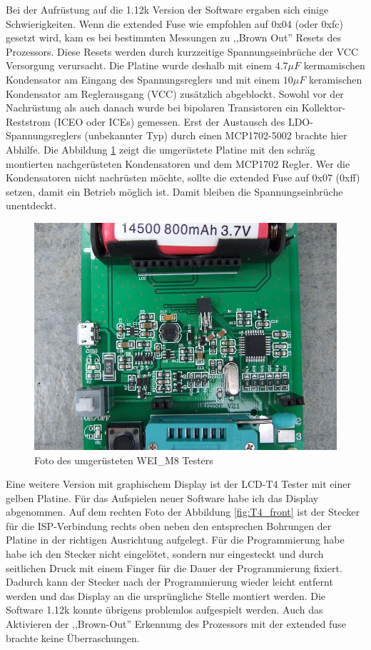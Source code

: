 Bei der Aufrüstung auf die 1.12k Version
der Software ergaben sich einige Schwierigkeiten. Wenn die extended Fuse wie empfohlen auf
0x04 (oder 0xfc) gesetzt wird, kam es bei bestimmten Messungen zu ,,Brown Out'' Resets des
Prozessors. Diese Resets werden durch kurzzeitige Spannungseinbrüche der VCC Versorgung
verursacht. Die Platine wurde deshalb mit einem \(4.7\mu F\) kermamischen Kondensator
am Eingang des Spannungsreglers und mit einem \(10\mu F\) keramischen Kondensator am
Reglerausgang (VCC) zusätzlich abgeblockt. Sowohl vor der Nachrüstung als auch danach
wurde bei bipolaren Transistoren ein Kollektor-Reststrom (ICEO oder ICEs) gemessen.
Erst der Austausch des LDO-Spannungsreglers (unbekannter Typ) durch einen MCP1702-5002
brachte hier Abhilfe. Die Abbildung \ref{fig:WeiM8mod} zeigt die umgerüstete Platine
mit den schräg montierten nachgerüsteten Kondensatoren und dem MCP1702 Regler.
Wer die Kondensatoren nicht nachrüsten möchte, sollte die extended Fuse auf 0x07 (0xff)
setzen, damit ein Betrieb möglich ist. Damit bleiben die Spannungseinbrüche unentdeckt.

\begin{figure}[H]
\centering
\includegraphics[width=12cm]{../PNG/WEI_M8_modified.JPG}
\caption{Foto des umgerüsteten WEI\_M8 Testers}
\label{fig:WeiM8mod}
\end{figure}

Eine weitere Version mit graphischem Display ist der LCD-T4 Tester mit einer gelben Platine.
Für das Aufspielen neuer Software habe ich das Display abgenommen.
Auf dem rechten Foto der Abbildung \ref{fig:T4_front} ist der Stecker für die ISP-Verbindung rechts oben
 neben den entsprechen Bohrungen der Platine in der richtigen Ausrichtung aufgelegt.
Für die Programmierung habe habe ich den Stecker nicht eingelötet, sondern nur eingesteckt und durch
seitlichen Druck mit einem Finger für die Dauer der Programmierung fixiert.
Dadurch kann der Stecker nach der Programmierung wieder leicht entfernt werden und das Display
an die ursprüngliche Stelle montiert werden.
Die Software 1.12k konnte übrigens problemlos aufgespielt werden.
Auch das Aktivieren der ,,Brown-Out'' Erkennung des Prozessors mit der extended fuse
brachte keine Überraschungen.

